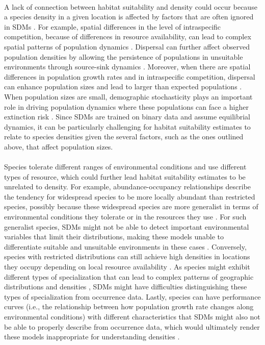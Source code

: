 \paragraph*{}
A lack of connection between habitat suitability and density could occur because a species density in a given location is affected by factors that are often ignored in SDMs \parencite{boulangeat2012}. For example, spatial differences in the level of intraspecific competition, because of differences in resource availability, can lead to complex spatial patterns of population dynamics \parencite{klomp1964, turnbull2007, zhang2021}. Dispersal can further affect observed population densities by allowing the persistence of populations in unsuitable environments through source-sink dynamics \parencite{pulliam1988,pulliam2000,furrer2016}. Moreover, when there are spatial differences in population growth rates and in intraspecific competition, dispersal can enhance population sizes and lead to larger than expected populations \parencite{oksanen1990,zhang2021}. When population sizes are small, demographic stochasticity plays an important role in driving population dynamics where these populations can face a higher extinction risk \parencite{gabriel1992,melbourne2008}. Since SDMs are trained on binary data and assume equilibrial dynamics, it can be particularly challenging for habitat suitability estimates to relate to species densities given the several factors, such as the ones outlined above, that affect population sizes.  
 
 

\paragraph*{}
Species tolerate different ranges of environmental conditions and use different types of resource, which could further lead habitat suitability estimates to be unrelated to density. For example, abundance-occupancy relationships describe the tendency for widespread species to be more locally abundant than restricted species, possibly because these widespread species are more generalist in terms of environmental conditions they tolerate or in the resources they use \parencite{borregaard2010,ten2022}. For such generalist species, SDMs might not be able to detect important environmental variables that limit their distributions, making these models unable to differentiate suitable and unsuitable environments in these cases \parencite{hernandez2006, van2016, harisena2021}. Conversely, species with restricted distributions can still achieve high densities in locations they occupy depending on local resource availability \parencite{komonen2009, crisfield2024}. As species might exhibit different types of specialization that can lead to complex patterns of geographic distributions and densities \parencite{crisfield2024}, SDMs might have difficulties distinguishing these types of specialization from occurrence data. Lastly, species can have performance curves (i.e., the relationship between how population growth rate changes along environmental conditions) with different characteristics that SDMs might also not be able to properly describe from occurrence data, which would ultimately render these models inappropriate for understanding densities \parencite{lee2022}.
 

